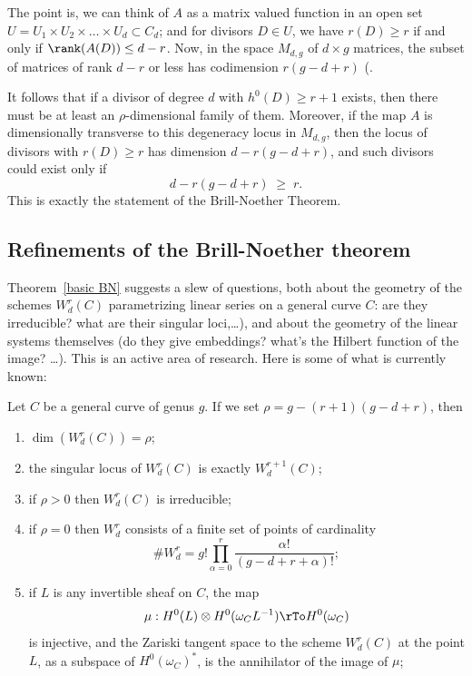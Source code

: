 The point is, we can think of $A$ as a matrix valued function in an open set $U = U_1 \times U_2 \times \dots \times U_d \subset C_d$; and for divisors $D \in U$, we have $r(D) \geq r$ if and only if $\rank(A(D)) \leq d-r$. Now, in the space $M_{d,g}$ of $d \times g$ matrices, the subset of matrices of rank $d-r$ or less has codimension $r(g-d+r)$ (\cite[Theorem ****]{Eisenbud1995}. 

It follows 
that if  a divisor of degree $d$ with $h^0(D) \geq r+1$ exists, then there must be at least an $\rho$-dimensional family of them. Moreover, if the map $A$ is dimensionally transverse to this degeneracy locus in $M_{d,g}$, then the locus of divisors with $r(D) \geq r$ has dimension $d - r(g-d+r)$, and such divisors could exist only if
$$
d - r(g-d+r) \; \geq \; r.
$$
This is exactly the statement of the Brill-Noether Theorem.


\subsection{Refinements of the Brill-Noether theorem}

Theorem~\ref{basic BN} suggests a slew of questions, both about the geometry of the schemes $W^r_d(C)$ parametrizing linear series on a general curve $C$: are they irreducible? what are their singular loci,\dots), and about the geometry of the linear systems themselves (do they give embeddings? what's the Hilbert function of the image? \dots). This is an active area of research. Here is some of what is currently known:

\begin{theorem}\label{Wrd omnibus }
Let $C$ be a general curve of genus $g$. If we set $\rho = g - (r+1)(g-d+r)$, then
\begin{enumerate}
\item $\dim(W^r_d(C)) = \rho$;
\item\label{sing wrd} the singular locus of $W^r_d(C)$ is exactly $W^{r+1}_d(C)$;
\item\label{irr wrd} if $\rho > 0$ then $W^r_d(C)$ is irreducible;
\item\label{rho=0} if $\rho = 0$ then $W^r_d$ consists of a finite set of  points of cardinality
$$
\#W^r_d = g! \prod_{\alpha=0}^r \frac{\alpha!}{(g-d+r+\alpha)!};
$$
\item\label{Petri} if $L$ is any invertible sheaf on $C$, the map
$$
\mu : H^0(L) \otimes H^0(\omega_CL^{-1}) \rTo H^0(\omega_C)
$$
is injective, and the Zariski tangent space to the scheme $W^r_d(C)$ at the point $L$, as a subspace
of $H^0(\omega_C)^*$, is the annihilator of the image of $\mu$;
\end{enumerate}
\end{theorem}

